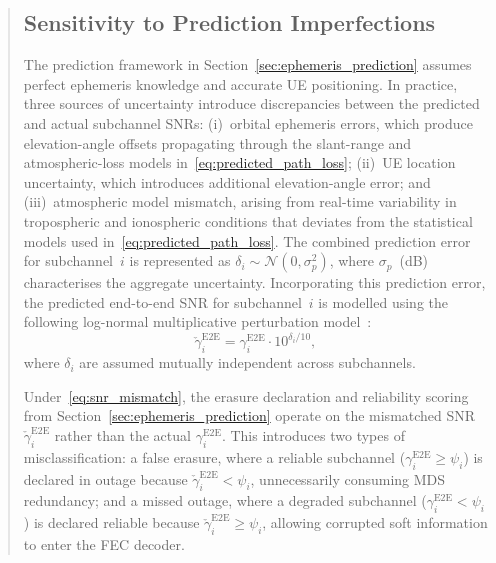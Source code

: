 \begin{quote}
{\color{blue}
\subsection{Sensitivity to Prediction Imperfections}

The prediction framework in Section~\ref{sec:ephemeris_prediction}
assumes perfect ephemeris knowledge and accurate UE positioning.
In practice, three sources of uncertainty introduce discrepancies
between the predicted and actual subchannel SNRs:
(i)~orbital ephemeris errors, which produce elevation-angle
offsets propagating through the slant-range
and atmospheric-loss models in~\eqref{eq:predicted_path_loss};
(ii)~UE location uncertainty, which introduces additional
elevation-angle error; and
(iii)~atmospheric model mismatch, arising from real-time
variability in tropospheric and ionospheric conditions that
deviates from the statistical models used
in~\eqref{eq:predicted_path_loss}.  The combined prediction error for subchannel~$i$ is represented as $\delta_i \sim \mathcal{N}(0, \sigma_p^2)$, where $\sigma_p$~(dB) characterises the aggregate uncertainty. Incorporating this prediction error, the predicted end-to-end SNR for subchannel~$i$ is modelled using the following log-normal multiplicative perturbation model~\cite{Papoulis2002}:
\begin{equation*}
\check{\gamma}_i^{\mathrm{E2E}} =
\gamma_i^{\mathrm{E2E}} \cdot 10^{\delta_i/10},
\end{equation*}
where $\delta_i$ are assumed mutually independent across subchannels.

Under~\eqref{eq:snr_mismatch}, the erasure declaration and
reliability scoring from Section~\ref{sec:ephemeris_prediction}
operate on the mismatched SNR $\check{\gamma}_i^{\mathrm{E2E}}$
rather than the actual $\gamma_i^{\mathrm{E2E}}$.
This introduces two types of misclassification:
a false erasure, where a reliable subchannel
($\gamma_i^{\mathrm{E2E}} \geq \psi_i$) is declared in outage
because $\check{\gamma}_i^{\mathrm{E2E}} < \psi_i$,
unnecessarily consuming MDS redundancy;
and a missed outage, where a degraded subchannel
($\gamma_i^{\mathrm{E2E}} < \psi_i$) is declared reliable
because $\check{\gamma}_i^{\mathrm{E2E}} \geq \psi_i$,
allowing corrupted soft information to enter the FEC decoder.

}
\end{quote}
